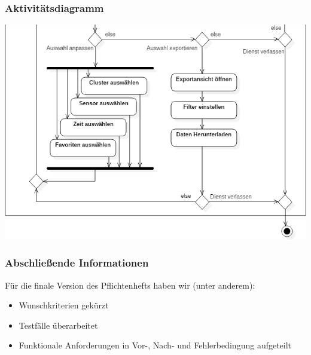 \documentclass{beamer}
\begin{document}
\begin{frame}
	\frametitle{Aktivitätsdiagramm}
	\centering
	\includegraphics[width=\linewidth]{diagrams/ActivityDiagram1Bottom}
\end{frame}

\begin{frame}
	\frametitle{Abschließende Informationen}
	Für die finale Version des Pflichtenhefts haben wir (unter anderem):
	\begin{itemize}
		\item Wunschkriterien gekürzt
		\item Testfälle überarbeitet
		\item Funktionale Anforderungen in Vor-, Nach- und Fehlerbedingung aufgeteilt
	\end{itemize}
\end{frame}
\end{document}

